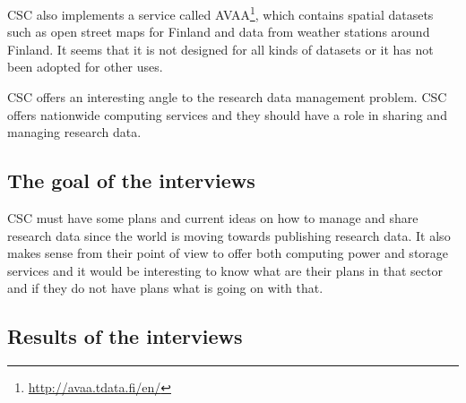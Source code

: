 CSC also implements a service called AVAA\footnote{\url{http://avaa.tdata.fi/en/}},
which contains spatial datasets such as open street maps for Finland and data from
weather stations around Finland. It seems that it is not designed for all kinds
of datasets or it has not been adopted for other uses.

\iffalse
CSC offers an interesting angle to the research data management problem. CSC
offers nationwide computing services and they should have a role in sharing and
managing research data.

\subsection{The goal of the interviews}

CSC must have some plans and current ideas on how to manage and share research
data since the world is moving towards publishing research data. It also makes
sense from their point of view to offer both computing power and storage
services and it would be interesting to know what are their plans in that
sector and if they do not have plans what is going on with that.

\subsection{Results of the interviews}

